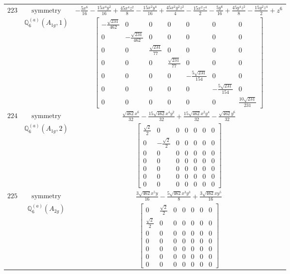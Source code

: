 \documentclass[fleqn,8pt,landscape]{jsarticle}
\begin{document}
\begin{longtable}{ccc}
$ 223 $ & $ \text{symmetry} $ & $ - \frac{5 x^{6}}{16} - \frac{15 x^{4} y^{2}}{16} + \frac{45 x^{4} z^{2}}{8} - \frac{15 x^{2} y^{4}}{16} + \frac{45 x^{2} y^{2} z^{2}}{4} - \frac{15 x^{2} z^{4}}{2} - \frac{5 y^{6}}{16} + \frac{45 y^{4} z^{2}}{8} - \frac{15 y^{2} z^{4}}{2} + z^{6} $ \\
$  $ & $ \mathbb{Q}_{6}^{(a)}(A_{1g},1) $ & $ \begin{bmatrix} - \frac{\sqrt{231}}{462} & 0 & 0 & 0 & 0 & 0 & 0 \\ 0 & - \frac{\sqrt{231}}{462} & 0 & 0 & 0 & 0 & 0 \\ 0 & 0 & \frac{\sqrt{231}}{77} & 0 & 0 & 0 & 0 \\ 0 & 0 & 0 & \frac{\sqrt{231}}{77} & 0 & 0 & 0 \\ 0 & 0 & 0 & 0 & - \frac{5 \sqrt{231}}{154} & 0 & 0 \\ 0 & 0 & 0 & 0 & 0 & - \frac{5 \sqrt{231}}{154} & 0 \\ 0 & 0 & 0 & 0 & 0 & 0 & \frac{10 \sqrt{231}}{231} \end{bmatrix} $ \\ \hline
$ 224 $ & $ \text{symmetry} $ & $ \frac{\sqrt{462} x^{6}}{32} - \frac{15 \sqrt{462} x^{4} y^{2}}{32} + \frac{15 \sqrt{462} x^{2} y^{4}}{32} - \frac{\sqrt{462} y^{6}}{32} $ \\
$  $ & $ \mathbb{Q}_{6}^{(a)}(A_{1g},2) $ & $ \begin{bmatrix} \frac{\sqrt{2}}{2} & 0 & 0 & 0 & 0 & 0 & 0 \\ 0 & - \frac{\sqrt{2}}{2} & 0 & 0 & 0 & 0 & 0 \\ 0 & 0 & 0 & 0 & 0 & 0 & 0 \\ 0 & 0 & 0 & 0 & 0 & 0 & 0 \\ 0 & 0 & 0 & 0 & 0 & 0 & 0 \\ 0 & 0 & 0 & 0 & 0 & 0 & 0 \\ 0 & 0 & 0 & 0 & 0 & 0 & 0 \end{bmatrix} $ \\ \hline
$ 225 $ & $ \text{symmetry} $ & $ \frac{3 \sqrt{462} x^{5} y}{16} - \frac{5 \sqrt{462} x^{3} y^{3}}{8} + \frac{3 \sqrt{462} x y^{5}}{16} $ \\
$  $ & $ \mathbb{Q}_{6}^{(a)}(A_{2g}) $ & $ \begin{bmatrix} 0 & \frac{\sqrt{2}}{2} & 0 & 0 & 0 & 0 & 0 \\ \frac{\sqrt{2}}{2} & 0 & 0 & 0 & 0 & 0 & 0 \\ 0 & 0 & 0 & 0 & 0 & 0 & 0 \\ 0 & 0 & 0 & 0 & 0 & 0 & 0 \\ 0 & 0 & 0 & 0 & 0 & 0 & 0 \\ 0 & 0 & 0 & 0 & 0 & 0 & 0 \\ 0 & 0 & 0 & 0 & 0 & 0 & 0 \end{bmatrix} $ \\ \hline

\end{longtable}
\end{document}
